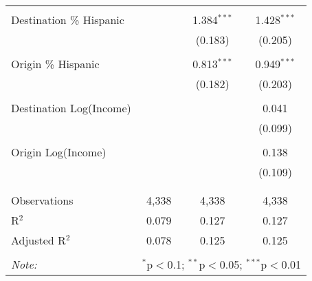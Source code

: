 \begin{table}[!htbp]
\begin{tabular}{@{\extracolsep{5pt}}lccc}
  & & & \\ 
 Destination \% Hispanic &  & 1.384$^{***}$ & 1.428$^{***}$ \\ 
  &  & (0.183) & (0.205) \\ 
  & & & \\ 
 Origin \% Hispanic &  & 0.813$^{***}$ & 0.949$^{***}$ \\ 
  &  & (0.182) & (0.203) \\ 
  & & & \\ 
 Destination Log(Income) &  &  & 0.041 \\ 
  &  &  & (0.099) \\ 
  & & & \\ 
 Origin Log(Income) &  &  & 0.138 \\ 
  &  &  & (0.109) \\ 
  & & & \\ 
\hline \\[-1.8ex] 
Observations & 4,338 & 4,338 & 4,338 \\ 
R$^{2}$ & 0.079 & 0.127 & 0.127 \\ 
Adjusted R$^{2}$ & 0.078 & 0.125 & 0.125 \\ 
\hline 
\hline \\[-1.8ex] 
\textit{Note:}  & \multicolumn{3}{r}{$^{*}$p$<$0.1; $^{**}$p$<$0.05; $^{***}$p$<$0.01} \\ 
\end{tabular} 
\end{table} 
